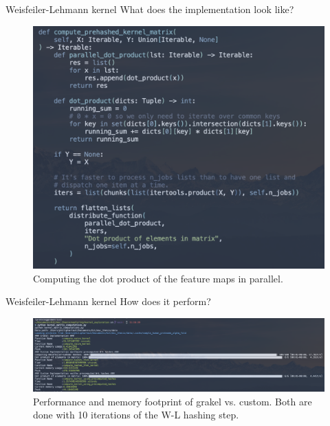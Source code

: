 \documentclass[aspectratio=169, 10pt, dvipsnames, handout]{beamer}
\begin{document}
\begin{frame}[fragile]{Weisfeiler-Lehmann kernel}
  What does the implementation look like?
  \begin{figure}
    \centering
    \includegraphics[width=.5\textwidth]{figures/dot_product.png}
    \caption{Computing the dot product of the feature maps in parallel.}
    \label{fig:hash_setting}
  \end{figure}
\end{frame}

\begin{frame}[fragile]{Weisfeiler-Lehmann kernel}
  How does it perform?
  \begin{figure}
    \centering
    \includegraphics[width=\textwidth]{figures/wl-kernel_exec.png}
    \caption{Performance and memory footprint of grakel vs. custom. Both are
      done with 10 iterations of the W-L hashing step.}
    \label{fig:performance}
  \end{figure}
\end{frame}
\end{document}

